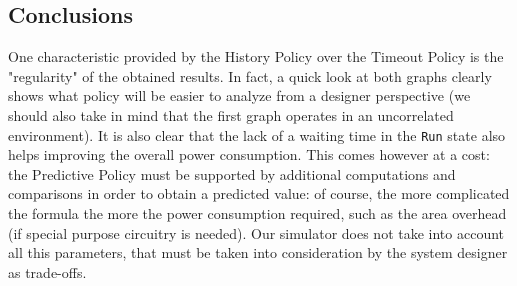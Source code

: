 \documentclass[a4paper]{article}
\begin{document}
        \subsection{Conclusions}
        One characteristic provided by the History Policy over the Timeout Policy is the "regularity" of the obtained results. In fact, a quick look at both graphs clearly shows what policy will be easier to analyze from a designer perspective (we should also take in mind that the first graph operates in an uncorrelated environment).
        It is also clear that the lack of a waiting time in the \texttt{Run} state also helps improving the overall power consumption. This comes however at a cost: the Predictive Policy must be supported by additional computations and comparisons in order to obtain a predicted value: of course, the more complicated the formula the more the power consumption required, such as the area overhead (if special purpose circuitry is needed). Our simulator does not take into account all this parameters, that must be taken into consideration by the system designer as trade-offs.
\end{document}
